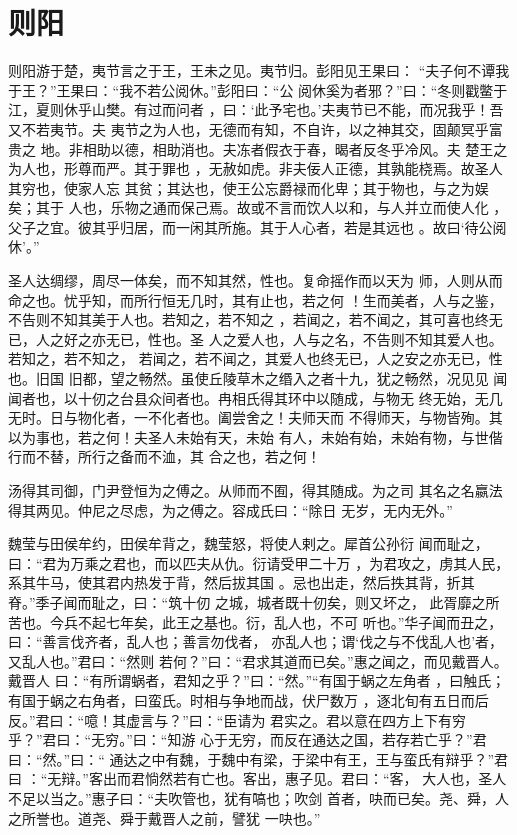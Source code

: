 \documentclass[12pt,UTF8]{ctexbook}
\begin{document}
\section{则阳}

则阳游于楚，夷节言之于王，王未之见。夷节归。彭阳见王果曰： “夫子何不谭我于王？”王果曰：“我不若公阅休。”彭阳曰：“公 阅休奚为者邪？”曰：“冬则戳鳖于江，夏则休乎山樊。有过而问者 ，曰：‘此予宅也。’夫夷节已不能，而况我乎！吾又不若夷节。夫 夷节之为人也，无德而有知，不自许，以之神其交，固颠冥乎富贵之 地。非相助以德，相助消也。夫冻者假衣于春，暍者反冬乎冷风。夫 楚王之为人也，形尊而严。其于罪也 ，无赦如虎。非夫佞人正德，其孰能桡焉。故圣人其穷也，使家人忘 其贫；其达也，使王公忘爵禄而化卑；其于物也，与之为娱矣；其于 人也，乐物之通而保己焉。故或不言而饮人以和，与人并立而使人化 ，父子之宜。彼其乎归居，而一闲其所施。其于人心者，若是其远也 。故曰‘待公阅休’。”

圣人达绸缪，周尽一体矣，而不知其然，性也。复命摇作而以天为 师，人则从而命之也。忧乎知，而所行恒无几时，其有止也，若之何 ！生而美者，人与之鉴，不告则不知其美于人也。若知之，若不知之 ，若闻之，若不闻之，其可喜也终无已，人之好之亦无已，性也。圣 人之爱人也，人与之名，不告则不知其爱人也。若知之，若不知之， 若闻之，若不闻之，其爱人也终无已，人之安之亦无已，性也。旧国 旧都，望之畅然。虽使丘陵草木之缗入之者十九，犹之畅然，况见见 闻闻者也，以十仞之台县众间者也。冉相氏得其环中以随成，与物无 终无始，无几无时。日与物化者，一不化者也。阖尝舍之！夫师天而 不得师天，与物皆殉。其以为事也，若之何！夫圣人未始有天，未始 有人，未始有始，未始有物，与世偕行而不替，所行之备而不洫，其 合之也，若之何！

汤得其司御，门尹登恒为之傅之。从师而不囿，得其随成。为之司 其名之名嬴法得其两见。仲尼之尽虑，为之傅之。容成氏曰：“除日 无岁，无内无外。”

魏莹与田侯牟约，田侯牟背之，魏莹怒，将使人剌之。犀首公孙衍 闻而耻之，曰：“君为万乘之君也，而以匹夫从仇。衍请受甲二十万 ，为君攻之，虏其人民，系其牛马，使其君内热发于背，然后拔其国 。忌也出走，然后抶其背，折其脊。”季子闻而耻之，曰：“筑十仞 之城，城者既十仞矣，则又坏之， 此胥靡之所苦也。今兵不起七年矣，此王之基也。衍，乱人也，不可 听也。”华子闻而丑之，曰：“善言伐齐者，乱人也；善言勿伐者， 亦乱人也；谓‘伐之与不伐乱人也’者，又乱人也。”君曰：“然则 若何？”曰：“君求其道而已矣。”惠之闻之，而见戴晋人。戴晋人 曰：“有所谓蜗者，君知之乎？”曰：“然。”“有国于蜗之左角者 ，曰触氏；有国于蜗之右角者，曰蛮氏。时相与争地而战，伏尸数万 ，逐北旬有五日而后反。”君曰：“噫！其虚言与？”曰：“臣请为 君实之。君以意在四方上下有穷乎？”君曰：“无穷。”曰：“知游 心于无穷，而反在通达之国，若存若亡乎？”君曰：“然。”曰：“ 通达之中有魏，于魏中有梁，于梁中有王，王与蛮氏有辩乎？”君曰 ：“无辩。”客出而君惝然若有亡也。客出，惠子见。君曰：“客， 大人也，圣人不足以当之。”惠子曰：“夫吹管也，犹有嗃也；吹剑 首者，吷而已矣。尧、舜，人之所誉也。道尧、舜于戴晋人之前，譬犹 一吷也。”
\end{document}

